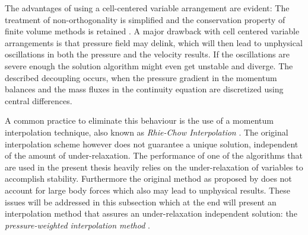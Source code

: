The advantages of using a cell-centered variable arrangement are evident: The treatment of non-orthogonality is simplified and the conservation property of finite volume methods is retained \cite{choi99,majumdar88,miller88,zhang14}. A major drawback with cell centered variable arrangements is that pressure field may delink, which will then lead to unphysical oscillations in both the pressure and the velocity results. If the oscillations are severe enough the solution algorithm might even get unstable and diverge. The described decoupling occurs, when the pressure gradient in the momentum balances and the mass fluxes in the continuity equation are discretized using central differences. 
  
A common practice to eliminate this behaviour is the use of a momentum interpolation technique, also known as \emph{Rhie-Chow Interpolation} \cite{rhie82}. The original interpolation scheme however does not guarantee a unique solution, independent of the amount of under-relaxation. The performance of one of the algorithms that are used in the present thesis heavily relies on the under-relaxation of variables to accomplish stability. Furthermore the original method as proposed by \cite{rhie82} does not account for large body forces which also may lead to unphysical results. These issues will be addressed in this subsection which at the end will present an interpolation method that assures an under-relaxation independent solution: the \emph{pressure-weighted interpolation method} \cite{miller88}.

